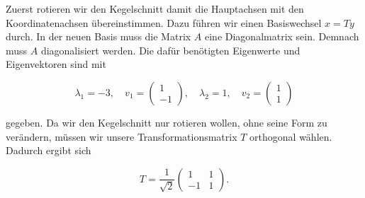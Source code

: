 \begin{figure}[h]
    \centering
\end{figure}

Zuerst rotieren wir den Kegelschnitt damit die Hauptachsen mit den Koordinatenachsen übereinstimmen. Dazu führen wir einen Basiswechsel \( x = Ty \) durch. In der neuen Basis muss die Matrix \( A \) eine Diagonalmatrix sein. Demnach muss \( A \) diagonalisiert werden. Die dafür benötigten Eigenwerte und Eigenvektoren sind mit 

\begin{equation*}
    \lambda_1 = -3, \quad v_1 = \begin{pmatrix} 1 \\ -1 \end{pmatrix}, \quad \lambda_2 = 1, \quad v_2 = \begin{pmatrix} 1 \\ 1 \end{pmatrix}
\end{equation*}

gegeben. Da wir den Kegelschnitt nur rotieren wollen, ohne seine Form zu verändern, müssen wir unsere Transformationsmatrix \( T \) orthogonal wählen. Dadurch ergibt sich 

\begin{equation*}
    T = \frac{1}{\sqrt{2}} \begin{pmatrix}
        1 & 1 \\
        -1 & 1
    \end{pmatrix}.
\end{equation*}


